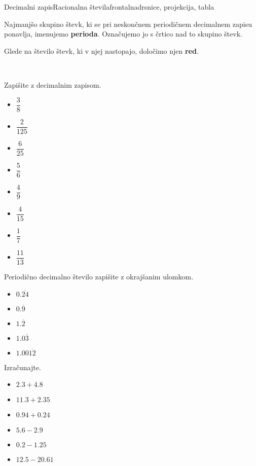 \begin{priprava}{11}{}{Decimalni zapis}{Racionalna števila}{frontalna}{drsnice, projekcija, tabla}
    ~

    Najmanjšo skupino števk, ki se pri neskončnem periodičnem decimalnem zapisu ponavlja, imenujemo \textbf{perioda}.
    Označujemo jo s črtico nad to skupino števk.

    Glede na število števk, ki v njej nastopajo, določimo njen \textbf{red}.

    


    ~\\

    \begin{multicols}{2}
        

\begin{naloga}
    Zapišite z decimalnim zapisom.
    \begin{itemize}
                \item $\dfrac{3}{8}$ 
                \item $\dfrac{2}{125}$ 
                \item $\dfrac{6}{25}$ 
                \item $\dfrac{5}{6}$ 
                \item $\dfrac{4}{9}$ 
                \item $\dfrac{4}{15}$ 
                \item $\dfrac{1}{7}$ 
                \item $\dfrac{11}{13}$ 
   \end{itemize}
\end{naloga}



\begin{naloga}
    Periodično decimalno število zapišite z okrajšanim ulomkom.
    \begin{itemize}
                \item $0.\overline{24}$ 
                \item $0.\overline{9}$ 
                \item $1.\overline{2}$ 
                \item $1.0\overline{3}$ 
                \item $1.00\overline{12}$ 
    \end{itemize}
\end{naloga}




\begin{naloga}
    Izračunajte.
    \begin{itemize}
                \item $2.3+4.8$ 
                \item $11.3+2.35$ 
                \item $0.94+0.24$ 
                \item $5.6-2.9$ 
                \item $0.2-1.25$ 
                \item $12.5-20.61$ 
    \end{itemize}
\end{naloga}





\end{multicols}
\end{priprava}
